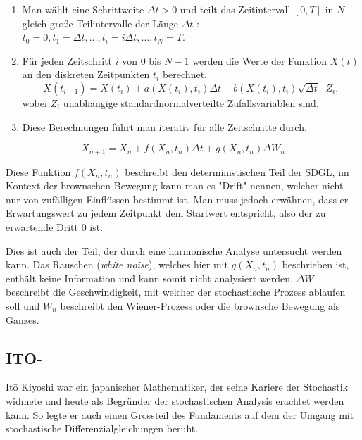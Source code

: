 \begin{enumerate}
	\item Man wählt eine Schrittweite $ \Delta t > 0 $ und teilt das Zeitintervall $ [0, T] $ in $ N $ gleich große Teilintervalle der Länge $ \Delta t$ : $ t_0 = 0, t_1 = \Delta t, \dots, t_i = i\Delta t, \dots, t_N = T $.
	\item Für jeden Zeitschritt $ i $ von $ 0 $ bis $ N-1 $ werden die Werte der Funktion $ X(t) $ an den diskreten Zeitpunkten $ t_i $ berechnet,
	\begin{equation}
		X(t_{i+1}) = X(t_i) + a(X(t_i), t_i) \Delta t + b(X(t_i), t_i) \sqrt{\Delta t} \cdot Z_i,
	\end{equation}
	wobei $ Z_i $ unabhängige standardnormalverteilte Zufallsvariablen sind.
	\item Diese Berechnungen führt man iterativ für alle Zeitschritte durch.
\end{enumerate}

\begin{equation}
	X_{n+1} = X_n + f(X_n,t_n) \Delta t + g(X_n,t_n) \Delta W_n
\end{equation}

Diese Funktion $ f(X_n,t_n) $ beschreibt den deterministischen Teil der SDGL, im Kontext der brownschen Bewegung kann man es "Drift" nennen, welcher nicht nur von zufälligen Einflüssen bestimmt ist. Man muss jedoch erwähnen, dass er Erwartungswert zu jedem Zeitpunkt dem Startwert entspricht, also der zu erwartende Dritt 0 ist. 


Dies ist auch der Teil, der durch eine harmonische Analyse untersucht werden kann. Das Rauschen (\textit{white noise}), welches hier mit $ g(X_n,t_n) $ beschrieben ist, enthält keine Information und kann somit nicht analysiert werden. $ \Delta W $ beschreibt die Geschwindigkeit, mit welcher der stochastische Prozess ablaufen soll und $ W_n $  beschreibt den Wiener-Prozess oder die brownsche Bewegung als Ganzes.



\subsection{ITO-\label{brown:ito}}

Itō Kiyoshi war ein japanischer Mathematiker, der seine Kariere der Stochastik widmete und heute als Begründer der stochastischen Analysis erachtet werden kann. So legte er auch einen Grossteil des Fundaments auf dem der Umgang mit stochastische Differenzialgleichungen beruht. 


